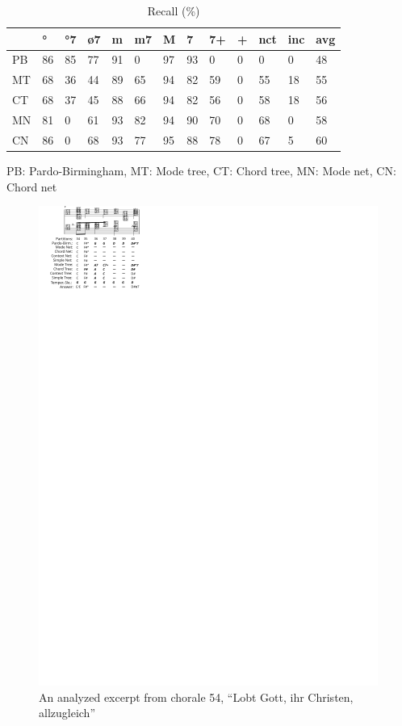 \documentclass{article}
\begin{document}
\begin{table}
  \centering
  \begin{tabular}{l|p{.1cm}p{.1cm}p{.1cm}p{.1cm}p{.1cm}p{.1cm}p{.1cm}p{.1cm}p{.01cm}p{.1cm}p{.35cm}|p{.3cm}}
                 &  °& °7& ø7& m&  m7&  M&  7& 7+&+&nct& inc& avg\\
    \hline
    PB   & 86& 85& 77& 91&  0& 97& 93&  0&  0&  0&  0& 48 \\
    MT   & 68& 36& 44& 89& 65& 94& 82& 59&  0& 55& 18& 55 \\
    CT   & 68& 37& 45& 88& 66& 94& 82& 56&  0& 58& 18& 56 \\
    MN   & 81&  0& 61& 93& 82& 94& 90& 70&  0& 68&  0& 58 \\
    CN   & 86&  0& 68& 93& 77& 95& 88& 78&  0& 67&  5& 60 \\
  \end{tabular}

\medskip

PB: Pardo-Birmingham, MT: Mode tree, CT: Chord tree, MN: Mode net,
CN: Chord net

  \caption{Recall (\%)}
  \label{tab:recall}
\end{table}

\begin{figure}
  \centering
  \includegraphics[scale=4]{coral-054}
  \caption{An analyzed excerpt from chorale 54, ``Lobt Gott, ihr
    Christen, allzugleich''}
  \label{fig:coral-54}
\end{figure}
\end{document}
